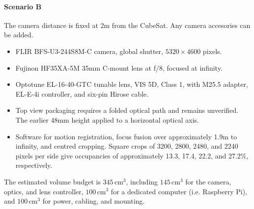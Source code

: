 \documentclass{article}
\begin{document}
\paragraph{Scenario B} The camera distance is fixed at 2m from the CubeSat. Any camera accesories can be added.
\begin{itemize}
\item FLIR BFS-U3-244S8M-C camera, global shutter, $5320\times4600$ pixels.
\item Fujinon HF35XA-5M 35mm C-mount lens at f/8, focused at infinity.
\item Optotune EL-16-40-GTC tunable lens, VIS 5D, Class 1, with M25.5 adapter, EL-E-4i controller, and six-pin Hirose cable.
\item Top view packaging requires a folded optical path and remains unverified. The earlier 48mm height applied to a horizontal optical axis.
\item Software for motion registration, focus fusion over approximately 1.9m to infinity, and centred cropping. Square crops of 3200, 2800, 2480, and 2240 pixels per side give occupancies of approximately 13.3, 17.4, 22.2, and 27.2\%, respectively.
\end{itemize}
The estimated volume budget is $345\,\mathrm{cm}^3$, including $145\,\mathrm{cm}^3$ for the camera, optics, and lens controller, $100\,\mathrm{cm}^3$ for a dedicated computer (i.e. Raspberry Pi), and $100\,\mathrm{cm}^3$ for power, cabling, and mounting.
\end{document}
